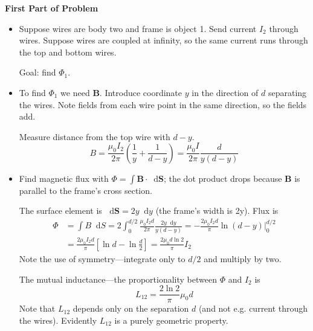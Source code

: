 \documentclass[11pt, a4paper]{article}
\newcommand{\diff}{\mathop{}\!\mathrm{d}} %
\renewcommand{\vec}[1]{\bm{#1}} %
\newcommand{\B}{\vec{B}} %
\newcommand{\mm}{\mu_{0}}  %
\newcommand{\m}{\vec{m}} %
\begin{document}
\textbf{First Part of Problem}
\begin{itemize}
	\item Suppose wires are body two and frame is object 1. Send current $ I_{2} $ through wires. Suppose wires are coupled at infinity, so the same current runs through the top and bottom wires.
	
	Goal: find $ \Phi_{1} $. 
	
	\item To find $ \Phi_{1} $ we need $ \B $. Introduce coordinate $ y $ in the direction of $ d $ separating the wires. Note fields from each wire point in the same direction, so the fields add.
	
	Measure distance from the top wire with $ d - y $. 
	\begin{equation*}
		B = \frac{\mm I_{2}}{2\pi} \left(\frac{1}{y} + \frac{1}{d-y}\right) =  \frac{\mm I}{2\pi}  \frac{d}{y(d-y)}
	\end{equation*}
	
	\item Find magnetic flux with $ \Phi = \int \B \cdot \diff \vec{S} $; the dot product drops because $ \B $ is parallel to the frame's cross section.
	
	The surface element is $ \diff \vec{S} = 2y\diff y $ (the frame's width is 2y). Flux is
	\begin{align*}
		\Phi &= \int B \diff S = 2\int_{0}^{d/2} \frac{\mm I_{2}d}{2\pi}  \frac{2y\diff y}{y(d-y)} = -\frac{2\mm I_{2}d}{\pi} \ln(d-y)\big |_{0}^{d/2}\\
		& =  \frac{2\mm I_{2}d}{\pi} \left[\ln d - \ln\frac{d}{2}\right] =  \frac{2\mm d \ln 2}{\pi}  I_{2}
	\end{align*}
	Note the use of symmetry---integrate only to $ d/2 $ and multiply by two.
	
	The mutual inductance---the proportionality between $ \Phi $ and $ I_{2} $ is 
	\begin{equation*}
		L_{12} = \frac{2\ln 2}{\pi} \mm d
	\end{equation*}
	Note that $ L_{12} $ depends only on the separation $ d $ (and not e.g. current through the wires). Evidently $ L_{12} $ is a purely geometric property. 
\end{itemize}
\end{document}
